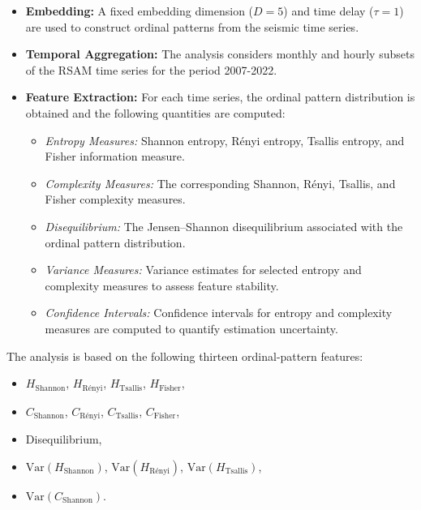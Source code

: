 \documentclass[12pt,a4paper]{article}
\begin{document}
\begin{itemize}
	
	\item \textbf{Embedding:}
	A fixed embedding dimension ($D=5$) and time delay ($\tau=1$) are used to construct ordinal patterns from the seismic time series.
	
	\item \textbf{Temporal Aggregation:}
	The analysis considers monthly and hourly subsets of the RSAM time series for the period 2007-2022.
	
	\item \textbf{Feature Extraction:}
	For each time series, the ordinal pattern distribution is obtained and the following quantities are computed:
	
	\begin{itemize}
		
		\item \emph{Entropy Measures:}
		Shannon entropy, R\'enyi entropy, Tsallis entropy, and Fisher information measure.
		
		\item \emph{Complexity Measures:}
		The corresponding Shannon, R\'enyi, Tsallis, and Fisher complexity measures.
		
		\item \emph{Disequilibrium:}
		The Jensen--Shannon disequilibrium associated with the ordinal pattern distribution.
		
		\item \emph{Variance Measures:}
		Variance estimates for selected entropy and complexity measures to assess feature stability.
		
		\item \emph{Confidence Intervals:}
		Confidence intervals for entropy and complexity measures are computed to quantify estimation uncertainty.
		
	\end{itemize}
	
\end{itemize}

The analysis is based on the following thirteen ordinal-pattern features:

\begin{itemize}
	\item $H_{\text{Shannon}}$,
	$H_{\text{R\'enyi}}$,
	$H_{\text{Tsallis}}$,
	$H_{\text{Fisher}}$,
	
	\item $C_{\text{Shannon}}$,
	$C_{\text{R\'enyi}}$,
	$C_{\text{Tsallis}}$,
	$C_{\text{Fisher}}$,
	
	\item Disequilibrium,
	
	\item $\mathrm{Var}(H_{\text{Shannon}})$,
	$\mathrm{Var}(H_{\text{R\'enyi}})$,
	$\mathrm{Var}(H_{\text{Tsallis}})$,
	
	\item $\mathrm{Var}(C_{\text{Shannon}})$.
\end{itemize}
\end{document}
